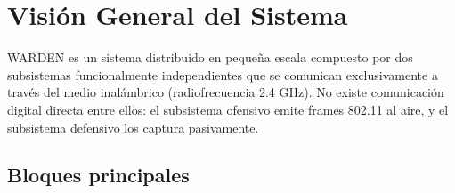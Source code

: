 \documentclass[11pt,a4paper]{article}
\begin{document}
\section{Visión General del Sistema}

WARDEN es un sistema distribuido en pequeña escala compuesto por dos
subsistemas funcionalmente independientes que se comunican exclusivamente
a través del medio inalámbrico (radiofrecuencia 2.4 GHz). No existe
comunicación digital directa entre ellos: el subsistema ofensivo emite
frames 802.11 al aire, y el subsistema defensivo los captura pasivamente.

\subsection{Bloques principales}
\end{document}
